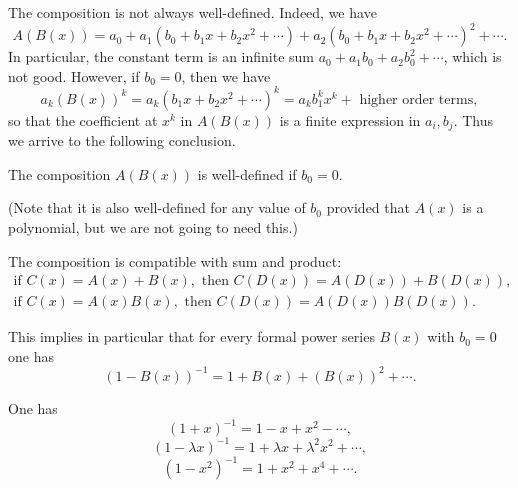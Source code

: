 \begin{page}
\setcounter{section}{2}
\setcounter{subsection}{2}
\setcounter{dfn}{5}
\label{portion:835}

The composition is not always well-defined. Indeed, we have
\[
A(B(x)) = a_0 + a_1(b_0 + b_1 x + b_2 x^2 + \cdots) + a_2(b_0 + b_1 x + b_2 x^2 + \cdots)^2 + \cdots.
\]
In particular, the constant term is an infinite sum $a_0 + a_1 b_0 + a_2 b_0^2 + \cdots$, which is not good.
However, if $b_0 = 0$, then we have
\[
a_k (B(x))^k = a_k (b_1 x + b_2 x^2 + \cdots)^k = a_k b_1^k x^k + \text{ higher order terms},
\]
so that the coefficient at $x^k$ in $A(B(x))$ is a finite expression in $a_i, b_j$.
Thus we arrive to the following conclusion.


\end{page}

\begin{page}
\setcounter{section}{2}
\setcounter{subsection}{2}
\setcounter{dfn}{6}
\label{portion:837}

\begin{lem}
The composition $A(B(x))$ is well-defined if $b_0 = 0$.
\end{lem}

\end{page}

\begin{page}
\setcounter{section}{2}
\setcounter{subsection}{2}
\setcounter{dfn}{6}
\label{portion:838}

(Note that it is also well-defined for any value of $b_0$ provided that $A(x)$ is a polynomial, but we are not going to need this.)

The composition is compatible with sum and product:
\begin{gather*}
\text{if } C(x) = A(x) + B(x), \text{ then } C(D(x)) = A(D(x)) + B(D(x)),\\
\text{if } C(x) = A(x)B(x), \text{ then } C(D(x)) = A(D(x))B(D(x)).
\end{gather*}

This implies in particular that for every formal power series $B(x)$ with $b_0 = 0$ one has
\[
(1 - B(x))^{-1} = 1 + B(x) + (B(x))^2 + \cdots.
\]


\end{page}

\begin{page}
\setcounter{section}{2}
\setcounter{subsection}{2}
\setcounter{dfn}{7}
\label{portion:840}

\begin{exl}
One has
\[
(1 + x)^{-1} = 1 - x + x^2 - \cdots,
\]
\[
(1 - \lambda x)^{-1} = 1 + \lambda x + \lambda^2 x^2 + \cdots,
\]
\[
(1 - x^2)^{-1} = 1 + x^2 + x^4 + \cdots.
\]
\end{exl}

\end{page}

